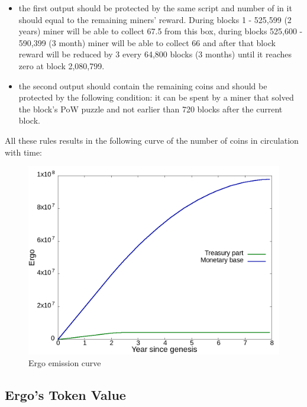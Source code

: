 \begin{itemize}
    \begin{itemize}
    \item{} the first output should be protected by the same script and number of \Erg{} in it should
    equal to the remaining miners' reward.
    During blocks 1 - 525,599 (2 years) miner will be able to collect 67.5 \Erg{} from this box,
    during blocks 525,600 - 590,399 (3 month) miner will be able to collect 66 \Erg{} and after
    that block reward will be reduced by 3 \Erg{} every 64,800 blocks (3 months) until it reaches zero
    at block 2,080,799.

    \item{} the second output should contain the remaining coins and should be protected by the following condition:
    it can be spent by a miner that solved the block's PoW puzzle and not earlier than 720 blocks after the current block.
    \end{itemize}

\end{itemize}

All these rules results in the following curve of the number of coins in circulation with time:

\begin{figure}[H]
    \centering
    \includegraphics[width=\textwidth]{img/emission.png}
    \caption{Ergo emission curve
    \label{fig:emission} }
\end{figure}


\subsection{Ergo's Token Value}
 \label{sec:ergo-value}

